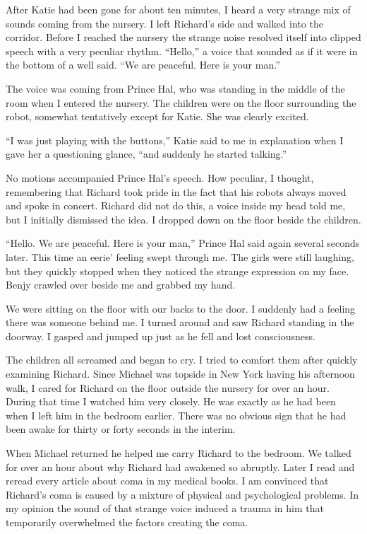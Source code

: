 \documentclass[]{article}
\begin{document}
{After Katie had been gone for about ten minutes, I heard a very strange mix of sounds coming from the nursery. I left Richard’s side and walked into the corridor. Before I reached the nursery the strange noise resolved itself into clipped speech with a very peculiar rhythm. “Hello,” a voice that sounded as if it were in the bottom of a well said. “We are peaceful. Here is your man.”

The voice was coming from Prince Hal, who was standing in the middle of the room when I entered the nursery. The children were on the floor surrounding the robot, somewhat tentatively except for Katie. She was clearly excited.

“I was just playing with the buttons,” Katie said to me in explanation when I gave her a questioning glance, “and suddenly he started talking.”

No motions accompanied Prince Hal’s speech. How peculiar, I thought, remembering that Richard took pride in the fact that his robots always moved and spoke in concert. Richard did not do this, a voice inside my head told me, but I initially dismissed the idea. I dropped down on the floor beside the children.

“Hello. We are peaceful. Here is your man,” Prince Hal said again several seconds later. This time an eerie’ feeling swept through me. The girls were still laughing, but they quickly stopped when they noticed the strange expression on my face. Benjy crawled over beside me and grabbed my hand.

We were sitting on the floor with our backs to the door. I suddenly had a feeling there was someone behind me. I turned around and saw Richard standing in the doorway. I gasped and jumped up just as he fell and lost consciousness.

The children all screamed and began to cry. I tried to comfort them after quickly examining Richard. Since Michael was topside in New York having his afternoon walk, I cared for Richard on the floor outside the nursery for over an hour. During that time I watched him very closely. He was exactly as he had been when I left him in the bedroom earlier. There was no obvious sign that he had been awake for thirty or forty seconds in the interim.

When Michael returned he helped me carry Richard to the bedroom. We talked for over an hour about why Richard had awakened so abruptly. Later I read and reread every article about coma in my medical books. I am convinced that Richard’s coma is caused by a mixture of physical and psychological problems. In my opinion the sound of that strange voice induced a trauma in him that temporarily overwhelmed the factors creating the coma.

}
\end{document}
